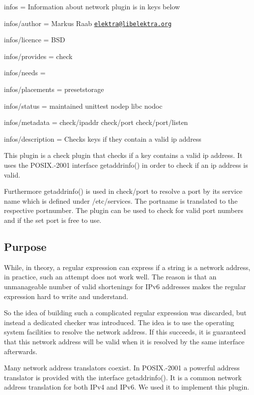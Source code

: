 
\begin{DoxyItemize}
\item infos = Information about network plugin is in keys below
\item infos/author = Markus Raab \href{mailto:elektra@libelektra.org}{\tt elektra@libelektra.\+org}
\item infos/licence = B\+SD
\item infos/provides = check
\item infos/needs =
\item infos/placements = presetstorage
\item infos/status = maintained unittest nodep libc nodoc
\item infos/metadata = check/ipaddr check/port check/port/listen
\item infos/description = Checks keys if they contain a valid ip address
\end{DoxyItemize}

This plugin is a check plugin that checks if a key contains a valid ip address. It uses the {\ttfamily P\+O\+S\+I\+X.-\/2001} interface {\ttfamily getaddrinfo()} in order to check if an ip address is valid.

Furthermore {\ttfamily getaddrinfo()} is used in {\ttfamily check/port} to resolve a port by its service name which is defined under {\ttfamily /etc/services}. The portname is translated to the respective portnumber. The plugin can be used to check for valid port numbers and if the set port is free to use.

\subsection*{Purpose}

While, in theory, a regular expression can express if a string is a network address, in practice, such an attempt does not work well. The reason is that an unmanageable number of valid shortenings for I\+Pv6 addresses makes the regular expression hard to write and understand.

So the idea of building such a complicated regular expression was discarded, but instead a dedicated checker was introduced. The idea is to use the operating system facilities to resolve the network address. If this succeeds, it is guaranteed that this network address will be valid when it is resolved by the same interface afterwards.

Many network address translators coexist. In {\ttfamily P\+O\+S\+I\+X.-\/2001} a powerful address translator is provided with the interface {\ttfamily getaddrinfo()}. It is a common network address translation for both I\+Pv4 and I\+Pv6. We used it to implement this plugin.

